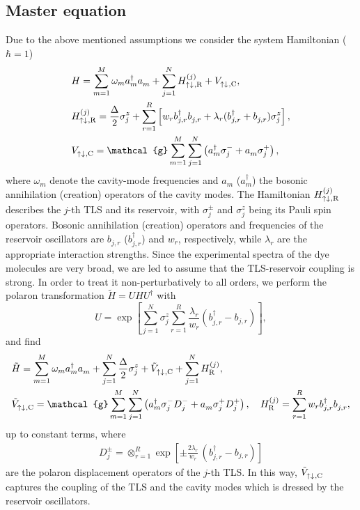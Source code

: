 \documentclass[12pt, a4paper]{iopart}
\begin{document}
\subsection{Master equation}

Due to the above mentioned assumptions we consider the system Hamiltonian ($\hbar=1$)
%
\numparts
\begin{eqnarray}
& H = \sum_{m=1}^M\omega_m a_m^\dag a_m^{} + \sum_{j=1}^N H_{\rm \uparrow\downarrow\:\!,R}^{(j)} + V^{}_{\rm \uparrow\downarrow\:\!,C},\label{Ham-a}\\
& H_{\rm \uparrow\downarrow\:\!,R}^{(j)} = \frac{\Delta}{2}\sigma_j^z +\sum_{r=1}^R\left[w_r b_{j,r}^\dag b_{j,r}^{}
+\lambda_r(b_{j,r}^\dag+b_{j,r}^{})\sigma_j^z\right],\label{Ham-b}\\
& V^{}_{\rm \uparrow\downarrow\:\!,C} = \mathcal{g}\sum_{m=1}^M\sum_{j=1}^N\left(a_m^\dag\sigma_j^- + a_m^{}\sigma_j^+\right),\label{Ham-c}
\end{eqnarray}
\endnumparts
%
where $\omega_m$ denote the cavity-mode frequencies and $a_m^{}$ ($a^\dag_m$) the bosonic annihilation (creation) operators of the cavity modes. The Hamiltonian $H_{\rm \uparrow\downarrow\:\!,R}^{(j)}$ describes the $j$-th TLS and its reservoir, with $\sigma_j^\pm$ and $\sigma_j^z$ being its Pauli spin operators. Bosonic annihilation (creation) operators and frequencies of the reservoir oscillators are $b_{j,r}^{}$ ($b_{j,r}^\dag$) and $w_r$, respectively, while $\lambda_r$ are the appropriate interaction strengths. Since the experimental spectra of the dye molecules are very broad, we are led to assume that the TLS-reservoir coupling is strong. In order to treat it non-perturbatively to all orders, we perform the polaron transformation $\tilde H=UHU^\dag$ with
%
\begin{equation}
U=\exp\left[\sum_{j=1}^N\sigma_j^z\sum_{r=1}^R \frac{\lambda_r}{w_r}(b_{j,r}^\dag-b_{j,r}^{})\right],
\end{equation}
%
and find
%
\numparts
\begin{eqnarray}
& \tilde H =\sum_{m=1}^M\omega_m a_m^\dag a_m^{}+\sum_{j=1}^N\frac{\Delta}{2}\sigma_j^z + \tilde V^{}_{\rm \uparrow\downarrow\:\!,C}
+ \sum_{j=1}^N H^{(j)}_{\rm R},\label{Ham-pol-a}\\
& \tilde V^{}_{\rm \uparrow\downarrow\:\!,C}=\mathcal{g}\sum_{m=1}^M\sum_{j=1}^N\left(a_m^\dag\sigma_j^-D_j^- + a_m^{}\sigma_j^+D_j^+\right),\quad
H^{(j)}_{\rm R} = \sum_{r=1}^R w_r b_{j,r}^\dag b_{j,r}^{},\label{Ham-pol-b}
\end{eqnarray}
\endnumparts
%
up to constant terms, where
%
\begin{eqnarray}
\label{Ds}
  D_j^\pm= {\displaystyle \otimes_{r=1}^R } \exp\left[\pm \frac{2\lambda_r}{w_r}\, (b_{j,r}^\dag-b_{j,r}^{})\right]
\end{eqnarray}
%
are the polaron displacement operators of the $j$-th TLS. In this way, $\tilde V^{}_{\rm \uparrow\downarrow\:\!,C}$ captures the coupling of the TLS and the cavity modes which is dressed by the reservoir oscillators.
\end{document}
